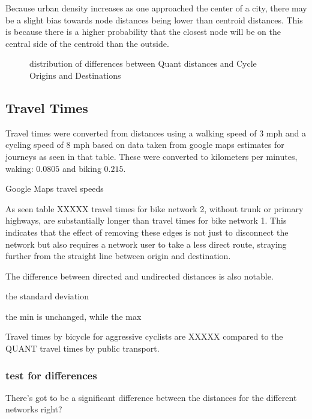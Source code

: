 Because urban density increases as one approached the center of a city, there may be a slight bias towards node distances being lower than centroid distances. This is because there is a higher probability that the closest node will be on the central side of the centroid than the outside. 



\begin{figure}
\centering
\caption{distribution of differences between Quant distances and Cycle Origins and Destinations}
\label{fig:diff_dist}
\end{figure}

\subsection{Travel Times}

Travel times were converted from distances using a walking speed of 3 mph and a cycling speed of 8 mph based on data taken from google maps estimates for journeys as seen in that table. These were converted to kilometers per minutes, waking: $0.0805$ and biking $0.215$. 

\begin{table}
\centering
\caption{Google Maps travel speeds}
\label{table:travel_speeds}
\end{table}

As seen table XXXXX travel times for bike network 2, without trunk or primary highways, are substantially longer than travel times for bike network 1. This indicates that the effect of removing these edges is not just to disconnect the network but also requires a network user to take a less direct route, straying further from the straight line between origin and destination. 

The difference between directed and undirected distances is also notable. 

the standard deviation 

the min is unchanged, while the max 

Travel times by bicycle for aggressive cyclists are XXXXX compared to the QUANT travel times by public transport. 

\subsubsection{test for differences}

There's got to be a significant difference between the distances for the different networks right?






